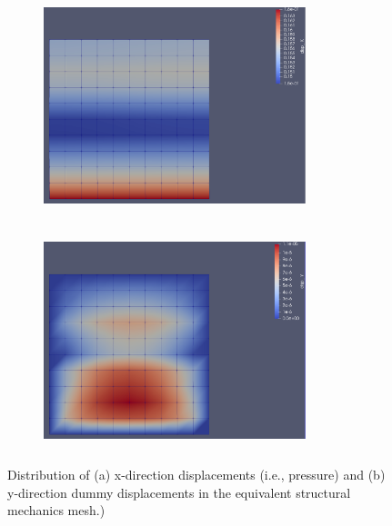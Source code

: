 \documentclass[3p]{elsarticle}
\begin{document}
\begin{figure}[H]
\begin{subfigure}{1\textwidth}
\centering
\includegraphics[width=3in, height=2.5in]{disp_X_eqstr_C200.png} 
\caption{}
\label{fig:X_dir}
\end{subfigure}
\begin{subfigure}{1\textwidth}
\centering
\includegraphics[width=3in, height=2.5in]{disp_Y_eqstr_C200.png} 
\caption{}
\label{fig:Y_dir}
\end{subfigure}
\caption{Distribution of (a) x-direction displacements (i.e., pressure) and (b) y-direction dummy displacements in the equivalent structural mechanics mesh.)}
\label{fig:XY_dir}
\end{figure}

\end{document}
